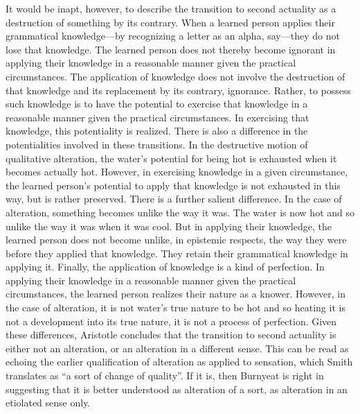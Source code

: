 It would be inapt, however, to describe the transition to second actuality as a destruction of something by its contrary. When a learned person applies their grammatical knowledge---by recognizing a letter as an alpha, say---they do not lose that knowledge. The learned person does not thereby become ignorant in applying their knowledge in a reasonable manner given the practical circumstances. The application of knowledge does not involve the destruction of that knowledge and its replacement by its contrary, ignorance. Rather, to possess such knowledge is to have the potential to exercise that knowledge in a reasonable manner given the practical circumstances. In exercising that knowledge, this potentiality is realized. There is also a difference in the potentialities involved in these transitions. In the destructive motion of qualitative alteration, the water's potential for being hot is exhausted when it becomes actually hot. However, in exercising knowledge in a given circumstance, the learned person's potential to apply that knowledge is not exhausted in this way, but is rather preserved. There is a further salient difference. In the case of alteration, something becomes unlike the way it was. The water is now hot and so unlike the way it was when it was cool. But in applying their knowledge, the learned person does not become unlike, in epistemic respects, the way they were before they applied that knowledge. They retain their grammatical knowledge in applying it. Finally, the application of knowledge is a kind of perfection. In applying their knowledge in a reasonable manner given the practical circumstances, the learned person realizes their nature as a knower. However, in the case of alteration, it is not water's true nature to be hot and so heating it is not a development into its true nature, it is not a process of perfection. Given these differences, Aristotle concludes that the transition to second actuality is either not an alteration, or an alteration in a different sense. This can be read as echoing the earlier qualification of alteration as applied to sensation, which Smith translates as ``a sort of change of quality''. If it is, then Burnyeat is right in suggesting that it is better understood as alteration of a sort, as alteration in an etiolated sense only.

